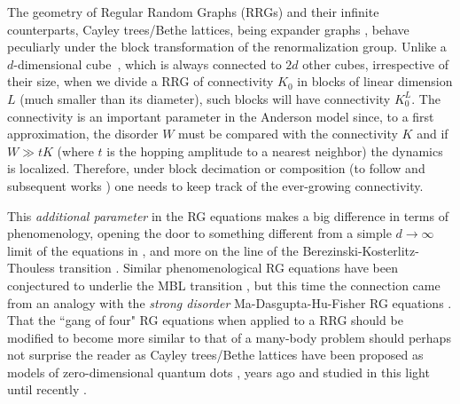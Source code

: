 \documentclass[reprint,aps,prl,superscriptaddress,english,nolongbibliography]{revtex4-2}
\begin{document}
The geometry of Regular Random Graphs (RRGs) and their infinite counterparts, Cayley trees/Bethe lattices, being expander graphs \cite{kowalski2019introduction}, behave peculiarly under the block transformation of the renormalization group. Unlike a $d$-dimensional cube~\cite{Tarquini2017critical}, which is always connected to $2d$ other cubes, irrespective of their size, when we divide a RRG of connectivity $K_0$ in blocks of linear dimension $L$ (much smaller than its diameter), such blocks will have connectivity $K_0^L$. The connectivity is an important parameter in the Anderson model since, to a first approximation, the disorder $W$ must be compared with the connectivity $K$ and if $W\gg t K$ (where $t$ is the hopping amplitude to a nearest neighbor) the dynamics is localized. Therefore, under block decimation or composition (to follow \cite{abrahams1979scaling} and subsequent works \cite{lee1979real}) one needs to keep track of the ever-growing connectivity.

This {\it additional parameter} in the RG equations makes a big difference in terms of phenomenology, opening the door to something different from a simple $d\to\infty$ limit of the equations in \cite{abrahams1979scaling}, and more on the line of the Berezinski-Kosterlitz-Thouless transition \cite{1971JETP...32..493B,1972JETP...34..610B,1973JPhC....6.1181K}. Similar phenomenological RG equations have been conjectured to underlie the MBL transition \cite{PhysRevX.5.031032,PhysRevX.5.031033,PhysRevB.93.224201}, but this time the connection came from an analogy with the {\it strong disorder} Ma-Dasgupta-Hu-Fisher RG equations \cite{ma1979random,dasgupta1980low,fisher1994random,huse2023strongrandomness}. That the ``gang of four" RG equations \cite{abrahams1979scaling} when applied to a RRG should be modified to become more similar to that of a many-body problem should perhaps not surprise the reader as Cayley trees/Bethe lattices have been proposed as models of zero-dimensional quantum dots \cite{sivan1994quasi}, years ago \cite{altshuler1997quasiparticle} and studied in this light until recently \cite{de2014anderson}.
\end{document}
